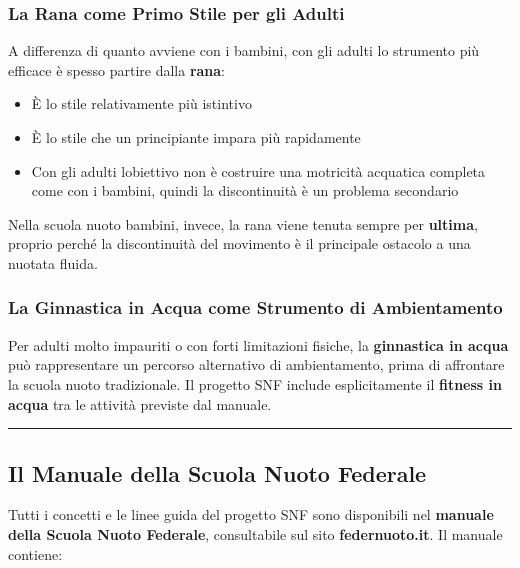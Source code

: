 \documentclass[a4paper,11pt]{article}
\providecommand{\tightlist}{%
  \setlength{\itemsep}{0pt}\setlength{\parskip}{0pt}}
\begin{document}
\subsubsection{La Rana come Primo Stile per gli
      Adulti}\label{la-rana-come-primo-stile-per-gli-adulti}

A differenza di quanto avviene con i bambini, con gli adulti lo
strumento più efficace è spesso partire dalla \textbf{rana}:

\begin{itemize}
      \tightlist
      \item
            È lo stile relativamente più istintivo
      \item
            È lo stile che un principiante impara più rapidamente
      \item
            Con gli adulti l\textquotesingle obiettivo non è costruire una
            motricità acquatica completa come con i bambini, quindi la
            discontinuità è un problema secondario
\end{itemize}

Nella scuola nuoto bambini, invece, la rana viene tenuta sempre per
\textbf{ultima}, proprio perché la discontinuità del movimento è il
principale ostacolo a una nuotata fluida.

\subsubsection{La Ginnastica in Acqua come Strumento di
      Ambientamento}\label{la-ginnastica-in-acqua-come-strumento-di-ambientamento}

Per adulti molto impauriti o con forti limitazioni fisiche, la
\textbf{ginnastica in acqua} può rappresentare un percorso alternativo
di ambientamento, prima di affrontare la scuola nuoto tradizionale. Il
progetto SNF include esplicitamente il \textbf{fitness in acqua} tra le
attività previste dal manuale.

\begin{center}\rule{0.5\linewidth}{0.5pt}\end{center}

\subsection{Il Manuale della Scuola Nuoto
      Federale}\label{il-manuale-della-scuola-nuoto-federale}

Tutti i concetti e le linee guida del progetto SNF sono disponibili nel
\textbf{manuale della Scuola Nuoto Federale}, consultabile sul sito
\textbf{federnuoto.it}. Il manuale contiene:
\end{document}
